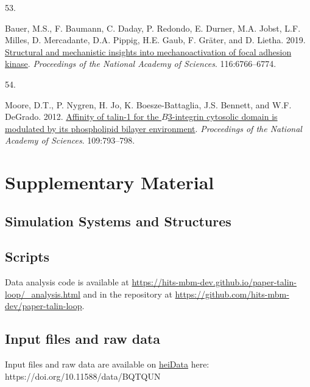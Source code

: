 \documentclass[
  twocolumn]{biophys-new-mod}
\newlength{\cslhangindent}
\newlength{\csllabelwidth}
\newlength{\cslentryspacingunit} %
\newenvironment{CSLReferences}[2] %
 {%
  \setlength{\parindent}{0pt}
  \ifodd #1
  \let\oldpar\par
  \def\par{\hangindent=\cslhangindent\oldpar}
  \fi
  \setlength{\parskip}{#2\cslentryspacingunit}
 }%
 {}
\newcommand{\CSLLeftMargin}[1]{\parbox[t]{\csllabelwidth}{#1}}
\newcommand{\CSLRightInline}[1]{\parbox[t]{\linewidth - \csllabelwidth}{#1}\break}
\begin{document}
\begin{CSLReferences}{0}{0}
\leavevmode{}%
\CSLLeftMargin{53. }%
\CSLRightInline{Bauer, M.S., F. Baumann, C. Daday, P. Redondo, E.
Durner, M.A. Jobst, L.F. Milles, D. Mercadante, D.A. Pippig, H.E. Gaub,
F. Gräter, and D. Lietha. 2019.
\href{https://doi.org/10.1073/pnas.1820567116}{Structural and
mechanistic insights into mechanoactivation of focal adhesion kinase}.
\emph{Proceedings of the National Academy of Sciences}. 116:6766--6774.}

\leavevmode{}%
\CSLLeftMargin{54. }%
\CSLRightInline{Moore, D.T., P. Nygren, H. Jo, K. Boesze-Battaglia, J.S.
Bennett, and W.F. DeGrado. 2012.
\href{https://doi.org/10.1073/pnas.1117220108}{Affinity of talin-1 for
the {\(B\)}3-integrin cytosolic domain is modulated by its phospholipid
bilayer environment}. \emph{Proceedings of the National Academy of
Sciences}. 109:793--798.}

\end{CSLReferences}

\newpage

\hypertarget{supplementary-material}{%
\section{Supplementary Material}\label{supplementary-material}}

\hypertarget{sec-system}{%
\subsection{Simulation Systems and Structures}\label{sec-system}}

\hypertarget{scripts}{%
\subsection{Scripts}\label{scripts}}

Data analysis code is available at
\url{https://hits-mbm-dev.github.io/paper-talin-loop/_analysis.html} and
in the repository at
\url{https://github.com/hits-mbm-dev/paper-talin-loop}.

\hypertarget{sec-data}{%
\subsection{Input files and raw data}\label{sec-data}}

Input files and raw data are available on
\href{https://heidata.uni-heidelberg.de/}{heiData} here:
https://doi.org/10.11588/data/BQTQUN
\end{document}
